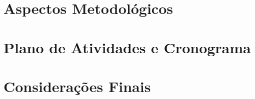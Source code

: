 \documentclass[projeto]{ufscar}
\begin{document}
\section{Aspectos Metodológicos}

\section{Plano de Atividades e Cronograma}

% 
\section{Considerações Finais}


\typeout{}







\end{document}

